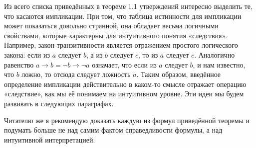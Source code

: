 Из всего списка приведённых в теореме 1.1 утверждений интересно выделить те, что касаются импликации. При том, что таблица истинности для импликации может показаться довольно странной,  она обладает весьма логичными свойствами, которые характерны для интуитивного понятия «следствия». Например, закон транзитивности является отражением простого логического закона: если из $a$ следует $b$, а из $b$ следует $c$, то из $a$ следует $c$. Аналогично равенство $a \rightarrow b = \neg b \rightarrow \neg a$ означает, что если из $a$ следует $b$, и нам известно, что $b$ ложно, то отсюда следует ложность $a$. Таким образом, введённое определение импликации действительно в каком-то смысле отражает операцию «следствие», как мы её понимаем на интуитивном уровне. Эти идеи мы будем развивать в следующих параграфах.

Читателю же я рекомендую доказать каждую из формул приведённой теоремы и подумать больше не над самим фактом справедливости формулы, а над интуитивной интерпретацией.


